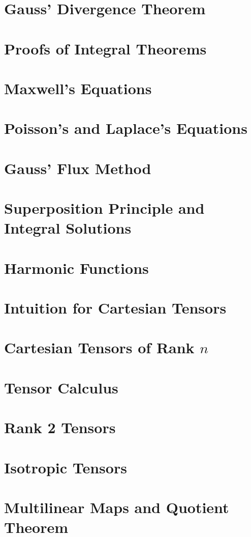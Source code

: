 \documentclass{article}
\begin{document}
\section{Gauss' Divergence Theorem}

\section{Proofs of Integral Theorems}

\section{Maxwell's Equations}

\section{Poisson's and Laplace's Equations}

\section{Gauss' Flux Method}

\section{Superposition Principle and Integral Solutions}

\section{Harmonic Functions}

\section{Intuition for Cartesian Tensors}

\section{Cartesian Tensors of Rank \(n\)}

\section{Tensor Calculus}

\section{Rank 2 Tensors}

\section{Isotropic Tensors}

\section{Multilinear Maps and Quotient Theorem}

\end{document}
